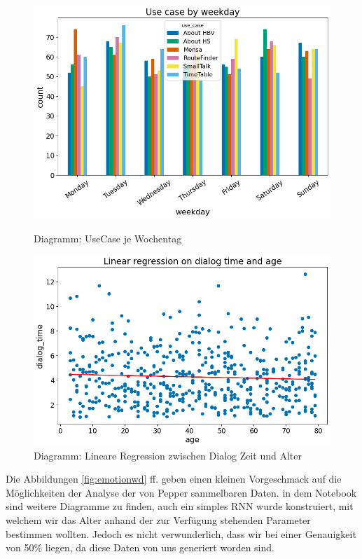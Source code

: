 \begin{figure}[H]
    \centering
    \begin{minipage}[b]{0.49\textwidth}
        \includegraphics[width=\textwidth]{Figures/analysis/usecasewd.png}
        \caption{Diagramm: UseCase je Wochentag}
        \label{fig:usecasewd}
    \end{minipage}
    \hfill
    \begin{minipage}[b]{0.49\textwidth}
        \includegraphics[width=\textwidth]{Figures/analysis/linreg.png}
        \caption{Diagramm: Lineare Regression zwischen Dialog Zeit und Alter}
        \label{fig:linreg}
    \end{minipage}
\end{figure}

Die Abbildungen \ref{fig:emotionwd} ff. geben einen kleinen Vorgeschmack auf die Möglichkeiten der Analyse der von Pepper
sammelbaren Daten. in dem Notebook sind weitere Diagramme zu finden, auch ein simples RNN wurde konstruiert, mit welchem
wir das Alter anhand der zur Verfügung stehenden Parameter bestimmen wollten. Jedoch es nicht verwunderlich, dass wir
bei einer Genauigkeit von 50\% liegen, da diese Daten von uns generiert worden sind.

